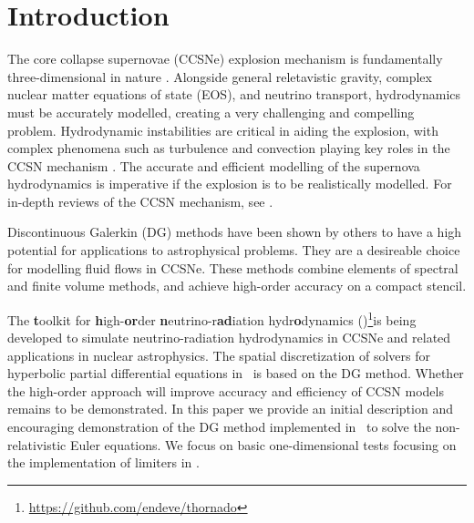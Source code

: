 \documentclass[onecolumn]{aastex62}
\begin{document}
\section{Introduction}
\label{sec:Intro}
The core collapse supernovae (CCSNe) explosion mechanism is fundamentally three-dimensional
in nature \citep[see e.g.,][]{blondin:2006, muller:2012, oconnor:2018b}. Alongside general
reletavistic gravity, complex nuclear matter equations of state (EOS), and
neutrino transport, hydrodynamics must be accurately modelled,
creating a very challenging and compelling problem. Hydrodynamic instabilities are critical
in aiding the explosion, with complex phenomena such as turbulence and
convection playing key roles in the CCSN mechanism
\citep{murphy:2011, murphy:2013, couch:2013, couch:2015a, radice:2016, mabanta:2018}.
The accurate and efficient modelling of the supernova hydrodynamics is imperative if the
explosion is to be realistically modelled.
For in-depth reviews of the CCSN mechanism, see
\citet{bethe:1990, janka:2007, janka:2012a, janka:2016, burrows:2013, hix:2014, muller:2016, couch:2017}.

Discontinuous Galerkin (DG) methods have been shown by others
\citep[see e.g.,][]{radice:2011, schaal:2015a, zanotti:2015, dumbser:2018} to have a
high potential for applications to astrophysical problems. They are a desireable
choice for modelling fluid flows in CCSNe. These methods combine elements of
spectral and finite volume methods, and achieve high-order accuracy
on a compact stencil.

The {\bf t}oolkit for {\bf h}igh-{\bf or}der {\bf n}eutrino-r{\bf ad}iation hydr{\bf o}dynamics
(\thornado)\footnote{\url{https://github.com/endeve/thornado}}is being developed to simulate neutrino-radiation
hydrodynamics in CCSNe and related applications in nuclear astrophysics.
The spatial discretization of solvers for hyperbolic partial differential equations in \thornado\, is based on the DG method.
Whether the high-order approach will improve accuracy and efficiency of CCSN models remains to be demonstrated.
In this paper we provide an initial description and encouraging demonstration
of the DG method implemented in \thornado\, to solve the non-relativistic Euler equations.
We focus on basic one-dimensional tests focusing on the implementation of limiters in \thornado.
\end{document}
